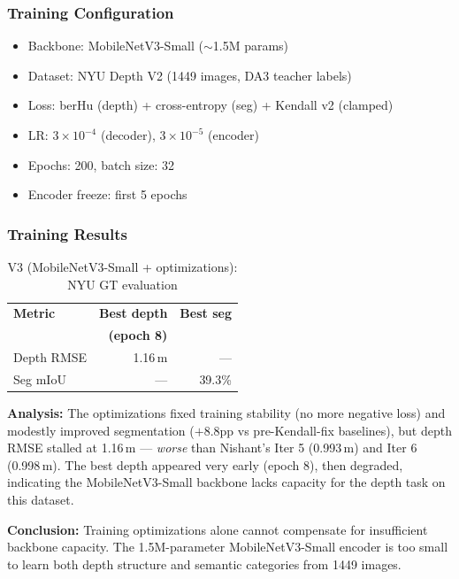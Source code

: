 \documentclass[11pt,a4paper]{article}
\begin{document}
\subsubsection{Training Configuration}

\begin{itemize}[nosep]
  \item Backbone: MobileNetV3-Small ($\sim$1.5M params)
  \item Dataset: NYU Depth V2 (1449 images, DA3 teacher labels)
  \item Loss: berHu (depth) + cross-entropy (seg) + Kendall v2 (clamped)
  \item LR: $3 \times 10^{-4}$ (decoder), $3 \times 10^{-5}$ (encoder)
  \item Epochs: 200, batch size: 32
  \item Encoder freeze: first 5 epochs
\end{itemize}

\subsubsection{Training Results}

\begin{table}[h]
\centering
\caption{V3 (MobileNetV3-Small + optimizations): NYU GT evaluation}
\label{tab:vivek-v3-eval}
\begin{tabular}{lrr}
\toprule
\textbf{Metric} & \textbf{Best depth} & \textbf{Best seg} \\
                 & \textbf{(epoch 8)}  & \\
\midrule
Depth RMSE       & 1.16\,m             & --- \\
Seg mIoU         & ---                 & 39.3\% \\
\bottomrule
\end{tabular}
\end{table}

\textbf{Analysis:} The optimizations fixed training stability (no more negative
loss) and modestly improved segmentation ($+8.8$pp vs pre-Kendall-fix baselines),
but depth RMSE stalled at 1.16\,m --- \emph{worse} than Nishant's Iter 5
(0.993\,m) and Iter 6 (0.998\,m). The best depth appeared very early (epoch 8),
then degraded, indicating the MobileNetV3-Small backbone lacks capacity
for the depth task on this dataset.

\textbf{Conclusion:} Training optimizations alone cannot compensate for
insufficient backbone capacity. The 1.5M-parameter MobileNetV3-Small encoder
is too small to learn both depth structure and semantic categories from 1449
images.
\end{document}

